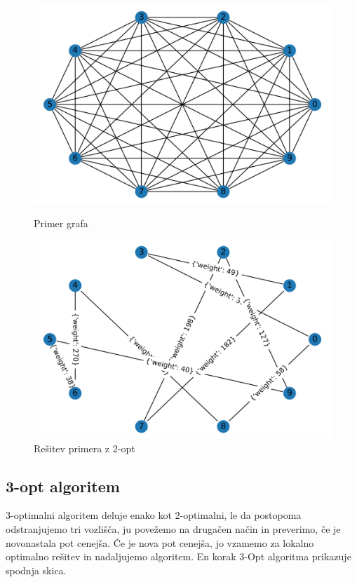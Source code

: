 \documentclass[12pt, a4paper]{article}
\begin{document}
\begin{figure}[!h]
    
    \begin{minipage}{0.5\textwidth}
    \includegraphics[width=7 cm]{primeri/primer2.png}
    \caption{Primer grafa}
    \label{primer_2_opt_2}
  \end{minipage}
 \hspace{1cm}
  \begin{minipage}{0.5\textwidth}
    \includegraphics[width=7 cm]{primeri/primer2_2opt.png}
    \caption{Rešitev primera z 2-opt}
    \label{resitev_2_opt_2}
  \end{minipage}
    
\end{figure}


\newpage
\subsection[3-opt algoritem]{3-opt algoritem}

3-optimalni algoritem deluje enako kot 2-optimalni, le da postopoma odstranjujemo tri vozlišča, ju povežemo na drugačen način in preverimo, če je novonastala pot cenejša. Če je nova pot cenejša, jo vzamemo za lokalno optimalno rešitev in nadaljujemo algoritem. En korak 3-Opt algoritma prikazuje spodnja skica.\\
\end{document}
